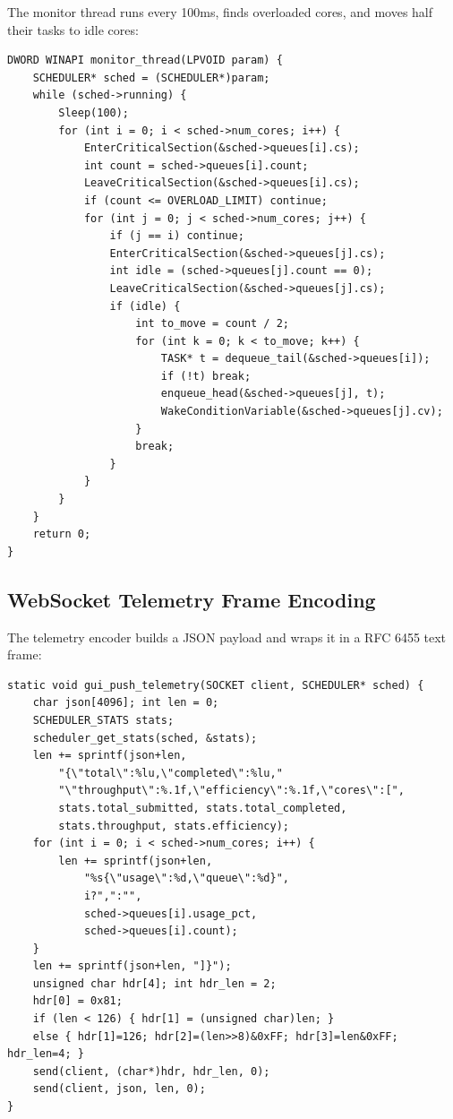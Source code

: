 \documentclass[12pt,a4paper]{article}
\begin{document}
The monitor thread runs every 100ms, finds overloaded cores, and moves half their tasks to idle cores:

\begin{lstlisting}[style=cstyle, caption={Push Migration Monitor}]
DWORD WINAPI monitor_thread(LPVOID param) {
    SCHEDULER* sched = (SCHEDULER*)param;
    while (sched->running) {
        Sleep(100);
        for (int i = 0; i < sched->num_cores; i++) {
            EnterCriticalSection(&sched->queues[i].cs);
            int count = sched->queues[i].count;
            LeaveCriticalSection(&sched->queues[i].cs);
            if (count <= OVERLOAD_LIMIT) continue;
            for (int j = 0; j < sched->num_cores; j++) {
                if (j == i) continue;
                EnterCriticalSection(&sched->queues[j].cs);
                int idle = (sched->queues[j].count == 0);
                LeaveCriticalSection(&sched->queues[j].cs);
                if (idle) {
                    int to_move = count / 2;
                    for (int k = 0; k < to_move; k++) {
                        TASK* t = dequeue_tail(&sched->queues[i]);
                        if (!t) break;
                        enqueue_head(&sched->queues[j], t);
                        WakeConditionVariable(&sched->queues[j].cv);
                    }
                    break;
                }
            }
        }
    }
    return 0;
}
\end{lstlisting}

\subsection{WebSocket Telemetry Frame Encoding}

The telemetry encoder builds a JSON payload and wraps it in a RFC 6455 text frame:

\begin{lstlisting}[style=cstyle, caption={WebSocket JSON Telemetry Push}]
static void gui_push_telemetry(SOCKET client, SCHEDULER* sched) {
    char json[4096]; int len = 0;
    SCHEDULER_STATS stats;
    scheduler_get_stats(sched, &stats);
    len += sprintf(json+len,
        "{\"total\":%lu,\"completed\":%lu,"
        "\"throughput\":%.1f,\"efficiency\":%.1f,\"cores\":[",
        stats.total_submitted, stats.total_completed,
        stats.throughput, stats.efficiency);
    for (int i = 0; i < sched->num_cores; i++) {
        len += sprintf(json+len,
            "%s{\"usage\":%d,\"queue\":%d}",
            i?",":"",
            sched->queues[i].usage_pct,
            sched->queues[i].count);
    }
    len += sprintf(json+len, "]}");
    unsigned char hdr[4]; int hdr_len = 2;
    hdr[0] = 0x81;
    if (len < 126) { hdr[1] = (unsigned char)len; }
    else { hdr[1]=126; hdr[2]=(len>>8)&0xFF; hdr[3]=len&0xFF; hdr_len=4; }
    send(client, (char*)hdr, hdr_len, 0);
    send(client, json, len, 0);
}
\end{lstlisting}
\end{document}
